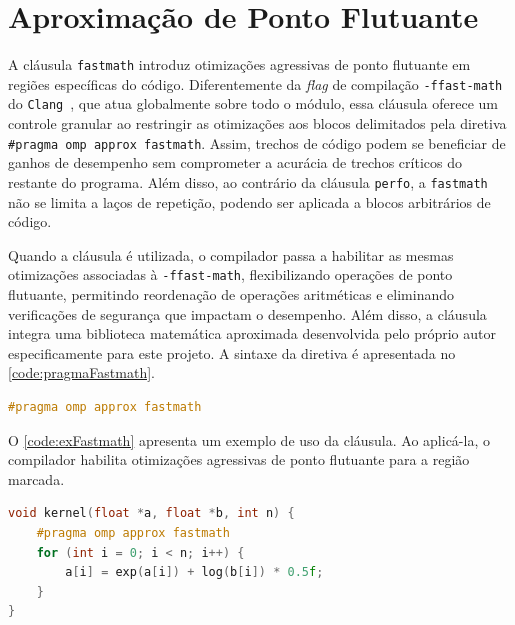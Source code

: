 \section{Aproximação de Ponto Flutuante}\label{subsec:pragmaFastmath}

A cláusula \texttt{fastmath} introduz otimizações agressivas de ponto flutuante em regiões específicas do código. Diferentemente da \textit{flag} de compilação \texttt{-ffast-math} do \texttt{Clang}~\cite{clangffast}, que atua globalmente sobre todo o módulo, essa cláusula oferece um controle granular ao restringir as otimizações aos blocos delimitados pela diretiva \texttt{\#pragma omp approx fastmath}. Assim, trechos de código podem se beneficiar de ganhos de desempenho sem comprometer a acurácia de trechos críticos do restante do programa. Além disso, ao contrário da cláusula \texttt{perfo}, a \texttt{fastmath} não se limita a laços de repetição, podendo ser aplicada a blocos arbitrários de código. 

Quando a cláusula é utilizada, o compilador passa a habilitar as mesmas otimizações associadas à \texttt{-ffast-math}, flexibilizando operações de ponto flutuante, permitindo reordenação de operações aritméticas e eliminando verificações de segurança que impactam o desempenho. Além disso, a cláusula integra uma biblioteca matemática aproximada desenvolvida pelo próprio autor especificamente para este projeto. A sintaxe da diretiva é apresentada no \autoref{code:pragmaFastmath}.

\begin{sourcecode}[htb]\caption{\label{code:pragmaFastmath}Sintaxe da cláusula \texttt{fastmath}.}
\begin{lstlisting}[frame=single, language=C++]
#pragma omp approx fastmath
\end{lstlisting}
\fonte{}
\end{sourcecode}

O \autoref{code:exFastmath} apresenta um exemplo de uso da cláusula. Ao aplicá-la, o compilador habilita otimizações agressivas de ponto flutuante para a região marcada.

\begin{sourcecode}[htb]
\caption{Exemplo de aplicação da cláusula \texttt{fastmath}.}
\label{code:exFastmath}
\begin{lstlisting}[frame=single, language=C++]
void kernel(float *a, float *b, int n) {
	#pragma omp approx fastmath
	for (int i = 0; i < n; i++) {
		a[i] = exp(a[i]) + log(b[i]) * 0.5f;
	}
}
\end{lstlisting}
\fonte{}
\end{sourcecode}

